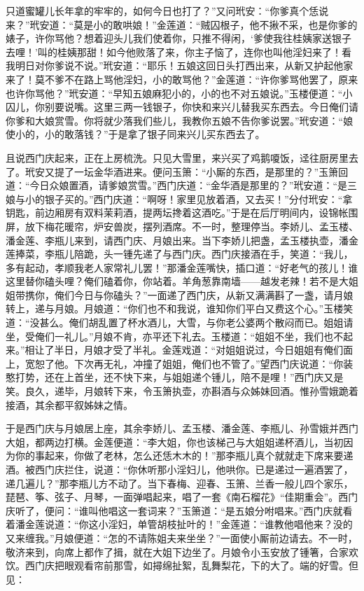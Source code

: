 只道蜜罐儿长年拿的牢牢的，如何今日也打了？”又问玳安：“你爹真个恁说来？”玳安道：“莫是小的敢哄娘！”金莲道：“贼囚根子，他不揪不采，也是你爹的婊子，许你骂他？想着迎头儿我们使着你，只推不得闲，‘爹使我往桂姨家送银子去哩！’叫的桂姨那甜！如今他败落了来，你主子恼了，连你也叫他淫妇来了！看我明日对你爹说不说。”玳安道：“耶乐！五娘这回日头打西出来，从新又护起他家来了！莫不爹不在路上骂他淫妇，小的敢骂他？”金莲道：“许你爹骂他罢了，原来也许你骂他？”玳安道：“早知五娘麻犯小的，小的也不对五娘说。”玉楼便道：“小囚儿，你别要说嘴。这里三两一钱银子，你快和来兴儿替我买东西去。今日俺们请你爹和大娘赏雪。你将就少落我们些儿，我教你五娘不告你爹说罢。”玳安道：“娘使小的，小的敢落钱？”于是拿了银子同来兴儿买东西去了。

且说西门庆起来，正在上房梳洗。只见大雪里，来兴买了鸡鹅嗄饭，迳往厨房里去了。玳安又提了一坛金华酒进来。便问玉箫：“小厮的东西，是那里的？”玉箫回道：“今日众娘置酒，请爹娘赏雪。”西门庆道：“金华酒是那里的？”玳安道：“是三娘与小的银子买的。”西门庆道：“啊呀！家里见放着酒，又去买！”分付玳安：“拿钥匙，前边厢房有双料茉莉酒，提两坛搀着这酒吃。”于是在后厅明间内，设锦帐围屏，放下梅花暖帘，炉安兽炭，摆列酒席。不一时，整理停当。李娇儿、孟玉楼、潘金莲、李瓶儿来到，请西门庆、月娘出来。当下李娇儿把盏，孟玉楼执壶，潘金莲捧菜，李瓶儿陪跪，头一锺先递了与西门庆。西门庆接酒在手，笑道：“我儿，多有起动，孝顺我老人家常礼儿罢！”那潘金莲嘴快，插口道：“好老气的孩儿！谁这里替你磕头哩？俺们磕着你，你站着。羊角葱靠南墙——越发老辣！若不是大姐姐带携你，俺们今日与你磕头？”一面递了西门庆，从新又满满斟了一盏，请月娘转上，递与月娘。月娘道：“你们也不和我说，谁知你们平白又费这个心。”玉楼笑道：“没甚么。俺们胡乱置了杯水酒儿，大雪，与你老公婆两个散闷而已。姐姐请坐，受俺们一礼儿。”月娘不肯，亦平还下礼去。玉楼道：“姐姐不坐，我们也不起来。”相让了半日，月娘才受了半礼。金莲戏道：“对姐姐说过，今日姐姐有俺们面上，宽恕了他。下次再无礼，冲撞了姐姐，俺们也不管了。”望西门庆说道：“你装憨打势，还在上首坐，还不快下来，与姐姐递个锺儿，陪不是哩！”西门庆又是笑。良久，递毕，月娘转下来，令玉箫执壶，亦斟酒与众姊妹回酒。惟孙雪娥跪着接酒，其余都平叙姊妹之情。

于是西门庆与月娘居上座，其余李娇儿、孟玉楼、潘金莲、李瓶儿、孙雪娥并西门大姐，都两边打横。金莲便道：“李大姐，你也该梯己与大姐姐递杯酒儿，当初因为你的事起来，你做了老林，怎么还恁木木的！”那李瓶儿真个就就走下席来要递酒。被西门庆拦住，说道：“你休听那小淫妇儿，他哄你。已是递过一遍酒罢了，递几遍儿？”那李瓶儿方不动了。当下春梅、迎春、玉箫、兰香一般儿四个家乐，琵琶、筝、弦子、月琴，一面弹唱起来，唱了一套《南石榴花》“佳期重会”。西门庆听了，便问：“谁叫他唱这一套词来？”玉箫道：“是五娘分咐唱来。”西门庆就看着潘金莲说道：“你这小淫妇，单管胡枝扯叶的！”金莲道：“谁教他唱他来？没的又来缠我。”月娘便道：“怎的不请陈姐夫来坐坐？”一面使小厮前边请去。不一时，敬济来到，向席上都作了揖，就在大姐下边坐了。月娘令小玉安放了锺箸，合家欢饮。西门庆把眼观看帘前那雪，如撏绵扯絮，乱舞梨花，下的大了。端的好雪。但见：

